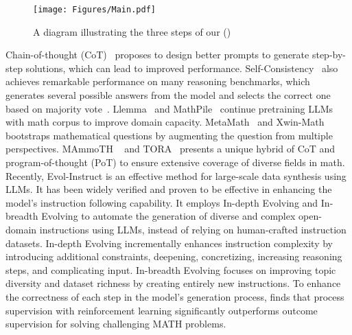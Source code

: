 \begin{figure}[t]
\centering
  \texttt{[image: Figures/Main.pdf]}

\caption{A diagram illustrating the three steps of our \REInameF{} (\textbf{\REInameS{}})}

\label{fig:reinforcement_evol_instruct_pic}
\end{figure}
Chain-of-thought (CoT)~\citep{wei2022chain} proposes to design better prompts to  generate step-by-step solutions, which can lead to improved performance. Self-Consistency~\citep{wang2023selfconsistency} also achieves remarkable performance on many reasoning benchmarks, which generates several possible answers from the model and selects the correct one based on majority vote~\citep{fu2023complexity-cot-based}. Llemma~\citep{azerbayev2023llemma} and MathPile~\citep{wang2023generative} continue pretraining LLMs with math corpus to improve domain capacity. MetaMath~\citep{yu2023metamath} and Xwin-Math~\citep{li2024-Xwin-math} bootstraps mathematical questions by augmenting the question from multiple perspectives. MAmmoTH ~\citep{yue2023mammoth} and TORA~\citep{gou2023tora} presents a unique hybrid of CoT and program-of-thought (PoT) to ensure extensive coverage of diverse fields in math. Recently, Evol-Instruct is an effective method for large-scale data synthesis using LLMs. It has been widely verified and proven to be effective in enhancing the model's instruction following capability. It employs In-depth Evolving and In-breadth Evolving to automate the generation of diverse and complex open-domain instructions using LLMs, instead of relying on human-crafted instruction datasets. In-depth Evolving incrementally enhances instruction complexity by introducing additional constraints, deepening, concretizing, increasing reasoning steps, and complicating input. In-breadth Evolving focuses on improving topic diversity and dataset richness by creating entirely new instructions.  To enhance the correctness of each step in the model's generation process, \citep{wang2024-mathshepherd,chen2024-autoprm, lightman2023openai-verify-step-by-step} finds that process supervision with reinforcement learning significantly outperforms outcome supervision for solving challenging MATH problems.

